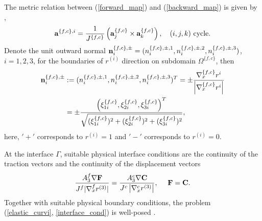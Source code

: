  The metric relation between (\ref{forward_map}) and (\ref{backward_map}) is given by \cite{thompson1985numerical},
\begin{equation*}
{\bf a}^{\{f,c\},i} = \frac{1}{J^{\{f,c\}}}\left({\bf a}_j^{\{f,c\}}\times{\bf a}_k^{\{f,c\}}\right), \ \ \ (i,j,k) \ \mbox{cycle}.
\end{equation*}
Denote the unit outward normal ${\bf n}_i^{\{f,c\},\pm} = (n_i^{\{f,c\},\pm,1},n_i^{\{f,c\},\pm,2},n_i^{\{f,c\},\pm,3})$, $i = 1,2,3$, for the boundaries of $r^{(i)}$ direction on subdomain $\Omega^{\{f,c\}}$, then
\begin{align}\label{outward_normal}
{\bf n}_i^{\{f,c\},\pm} &:= (n^{\{f,c\},\pm,1}_i,n^{\{f,c\},\pm,2}_i,n^{\{f,c\},\pm,3}_i)^T = \pm \frac{\nabla_x^{\{f,c\}} r^{i}}{\left|\nabla_x^{\{f,c\}} r^{i}\right|} \nonumber\\
&= \pm\frac{ \left(\xi_{1i}^{\{f,c\}},\xi_{2i}^{\{f,c\}},\xi_{3i}^{\{f,c\}}\right)^T}{\sqrt{(\xi_{1i}^{\{f,c\}})^2+(\xi_{2i}^{\{f,c\}})^2+(\xi_{3i}^{\{f,c\}})^2}},
\end{align}
here, $'+'$ corresponds to $r^{(i)} = 1$ and $'-'$ corresponds to $r^{(i)} = 0$.  

At the interface $\Gamma$, suitable physical interface conditions are the continuity of the traction vectors and the continuity of the displacement vectors 
\begin{equation}\label{interface_cond}
\frac{A_3^f\nabla{\bf F}}{J^f|\nabla_x^f r^{(3)}|}  = \frac{A_3^c\nabla{\bf C}}{J^c\left|\nabla_x^c r^{(3)}\right|}, \ \ \ \ {\bf F} = {\bf C}.
\end{equation}
Together with suitable physical boundary conditions, the problem (\ref{elastic_curvi}, \ref{interface_cond}) is well-posed \cite{duru2014stable, petersson2015wave}.


